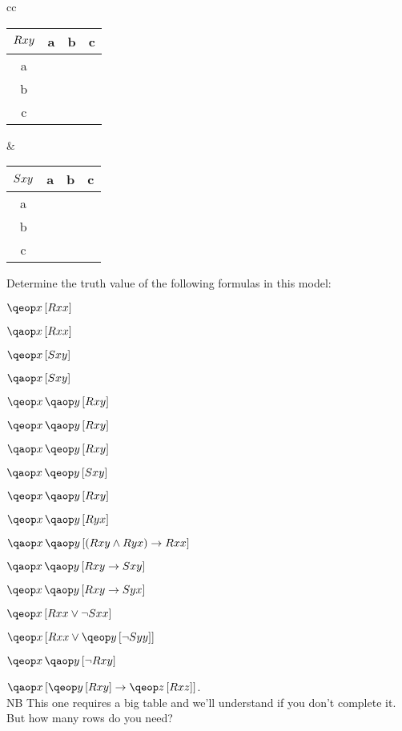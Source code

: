 \documentclass[PHIL101-Textbook.tex]{subfiles}
\begin{document}
\begin{center}
  \begin{tabular}{cc}
	\begin{tabular}{c|ccc}
	  $\mathord{R}{xy}$ & a & b & c\\ \hline
	  a & \vT & \vT & \vF \\
	  b & \vF & \vF & \vF \\
	  c & \vT & \vF & \vT \\
	\end{tabular}
  &
\begin{tabular}{c|ccc}
	  $\mathord{S}{xy}$ & a & b & c\\
	  \hline
	  a & \vF & \vT & \vF \\
	  b & \vT & \vT & \vT \\
	  c & \vF & \vT & \vF 
\end{tabular}
\end{tabular}
\end{center}
Determine the truth value of the following formulas in this model:
\begin{earg}
\item $\qeb{x}{\atom R xx}$
\item $\qab{x}{\atom{R}{xx}}$
\item $\qeb{x}{\atom S xy}$
\item $\qab{x}{\atom S{xy}}$
\item $\qe{x}{\qab{y}{ \atom R xy}}$
\item $\qe{x}{\qab{y}{ \atom R xy}}$
\item $\qa{x}{\qeb{y}{ \atom R xy}}$
\item $\qa{x}{\qeb{y}{ \atom S xy}}$
\item $\qe{x}{\qab{y}{ \atom R xy}}$
\item $\qe{x}{\qab{y}{ \atom R yx}}$
\item $\qa{x}{\qab{y}{(\atom{R}{xy} \eand \atom{R}{yx}) \eif \atom{R}{xx}}}$
\item $\qa{x}{\qab{y}{\atom{R}{xy}\eif \atom S {xy}}}$
\item $\qe{x}{\qab{y}{\atom R {xy}\eif \atom S yx}}$
\item $\qeb{x}{\atom R {xx} \lor \enot \atom S xx}$
\item $\qeb{x}{\atom R{xx} \lor \qeb{y}{\enot \atom S yy}}$
\item $\qe{x}{\qab{y}{\enot \atom R xy}}$
\item $\qab{x}{\qeb{y}{\atom R xy} \eif \qeb{z}{ \atom{R}{xz}}}$.\\
NB This one requires a big table and we'll understand if you don't complete it. But how many rows do you need? 
\end{earg}
\end{document}
